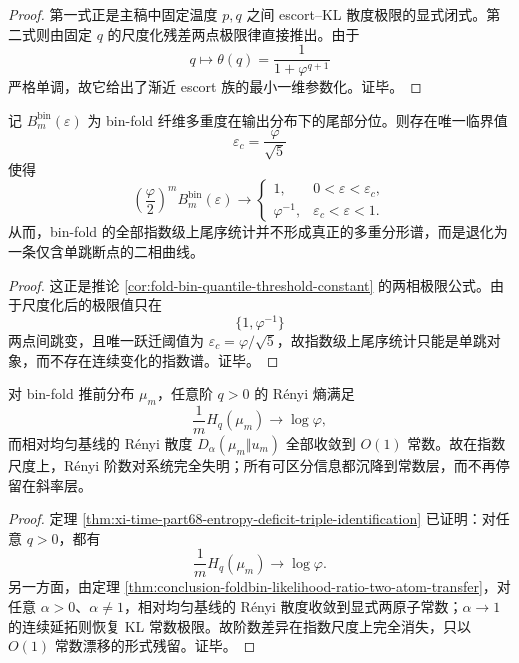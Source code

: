 \begin{proof}
第一式正是主稿中固定温度 \(p,q\) 之间 escort--KL 散度极限的显式闭式。第二式则由固定 \(q\) 的尺度化残差两点极限律直接推出。由于
\[
q\longmapsto \theta(q)=\frac{1}{1+\varphi^{q+1}}
\]
严格单调，故它给出了渐近 escort 族的最小一维参数化。证毕。
\end{proof}

\begin{theorem}[上尾序统计的单跳塌缩]\label{thm:conclusion-binfold-tail-order-statistics-single-jump-collapse}
记 \(B_m^{\mathrm{bin}}(\varepsilon)\) 为 bin-fold 纤维多重度在输出分布下的尾部分位。则存在唯一临界值
\[
\varepsilon_c=\frac{\varphi}{\sqrt5}
\]
使得
\[
\left(\frac{\varphi}{2}\right)^m B_m^{\mathrm{bin}}(\varepsilon)
\longrightarrow
\begin{cases}
1, & 0<\varepsilon<\varepsilon_c,\\[2mm]
\varphi^{-1}, & \varepsilon_c<\varepsilon<1.
\end{cases}
\]
从而，bin-fold 的全部指数级上尾序统计并不形成真正的多重分形谱，而是退化为一条仅含单跳断点的二相曲线。
\end{theorem}

\begin{proof}
这正是推论 \ref{cor:fold-bin-quantile-threshold-constant} 的两相极限公式。由于尺度化后的极限值只在
\[
\{1,\varphi^{-1}\}
\]
两点间跳变，且唯一跃迁阈值为 \(\varepsilon_c=\varphi/\sqrt5\)，故指数级上尾序统计只能是单跳对象，而不存在连续变化的指数谱。证毕。
\end{proof}

\begin{corollary}\label{cor:conclusion-binfold-renyi-exponential-blindness}
对 bin-fold 推前分布 \(\mu_m\)，任意阶 \(q>0\) 的 Rényi 熵满足
\[
\frac1m H_q(\mu_m)\to \log\varphi,
\]
而相对均匀基线的 Rényi 散度 \(D_\alpha(\mu_m\Vert u_m)\) 全部收敛到 \(O(1)\) 常数。故在指数尺度上，Rényi 阶数对系统完全失明；所有可区分信息都沉降到常数层，而不再停留在斜率层。
\end{corollary}

\begin{proof}
定理 \ref{thm:xi-time-part68-entropy-deficit-triple-identification} 已证明：对任意 \(q>0\)，都有
\[
\frac1m H_q(\mu_m)\to \log\varphi.
\]
另一方面，由定理 \ref{thm:conclusion-foldbin-likelihood-ratio-two-atom-transfer}，对任意 \(\alpha>0\)、\(\alpha\neq 1\)，相对均匀基线的 Rényi 散度收敛到显式两原子常数；\(\alpha\to 1\) 的连续延拓则恢复 KL 常数极限。故阶数差异在指数尺度上完全消失，只以 \(O(1)\) 常数漂移的形式残留。证毕。
\end{proof}

